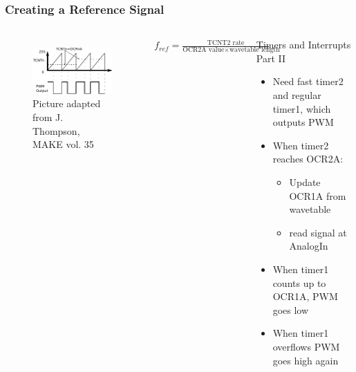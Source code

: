 \documentclass{beamer}
\begin{document}
\begin{frame}
\frametitle{Creating a Reference Signal}
\begin{columns}[T]
	\vspace{.5cm}
	   \begin{figure}
	    \includegraphics[scale=1.25]{Bitbang}\\
	    \tiny {Picture adapted from J. Thompson, MAKE vol. 35}
	    \end{figure}
	    \vspace{.3cm}
	    \begin{block}
	    $f_{ref}=\frac{\text{TCNT2 rate}}{\text{OCR2A value}\times\text{wavetable length}}$
	    \end{block}

	\begin{block}{Timers and Interrupts Part II}
	\begin{itemize}
	\item {Need fast timer2 and regular timer1, which outputs PWM}
	\item{When timer2 reaches OCR2A:}
	\begin{itemize}
        \item {Update OCR1A from wavetable}
        \item{ read signal at AnalogIn}
	\end{itemize}
	\item{When timer1 counts up to OCR1A, PWM goes low}
	\item {When timer1 overflows PWM goes high again}
	
	\end{itemize}
	
	\end{block}
\end{columns}
\end{frame}
\end{document}
